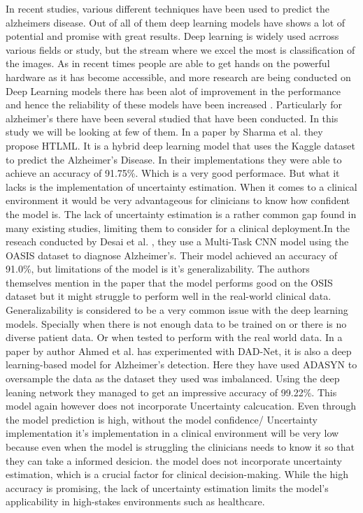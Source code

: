 \documentclass[12pt,onecolumn]{report}
\begin{document}
In recent studies, various different techniques have been used to predict the alzheimers disease. Out of all of them deep learning models have shows a lot of potential and promise with great results. Deep learning is widely used acrross various fields or study, but the stream where we excel the most is classification of the images. As in recent times people are able to get hands on the powerful hardware as it has become accessible, and more research are being conducted on Deep Learning models there has been alot of improvement in the performance and hence the reliability of these models have been increased \cite{Yu2023}.
Particularly for alzheimer's there have been several studied that have been conducted. In this study we will be looking at few of them. In a paper by Sharma et al. \cite{2022Sarang} they propose HTLML. It is a hybrid deep learning model that uses the Kaggle dataset to predict the Alzheimer’s Disease. In their implementations they were able to achieve an accuracy of 91.75\%. Which is a very good performace. But what it lacks is the implementation of uncertainty estimation. When it comes to a clinical environment it would be very advantageous for clinicians to know how confident the model is. The lack of uncertainty estimation is a rather common gap found in many existing studies, limiting them to consider for a clinical deployment.In the reseach conducted by Desai et al. \cite{2024Desai}, they use a Multi-Task CNN model using the OASIS dataset to diagnose Alzheimer’s. Their model achieved an accuracy of 91.0\%, but limitations of the model is it's generalizability. The authors themselves mention in the paper that the model performs good on the OSIS dataset but it might struggle to perform well in the real-world clinical data. Generalizability is considered to be a very common issue with the deep learning models. Specially when there is not enough data to be trained on or there is no diverse patient data. Or when tested to perform with the real world data. In a paper by author Ahmed et al. \cite{2022Ahmed} has experimented with DAD-Net, it is also a deep learning-based model for Alzheimer’s detection. Here they have used ADASYN to oversample the data as the dataset they used was imbalanced. Using the deep leaning network they managed to get an impressive accuracy of 99.22\%. This model again however does not incorporate Uncertainty calcucation. Even through the model prediction is high, without the model confidence/ Uncertainty implementation it's implementation in a clinical environment will be very low because even when the model is struggling the clinicians needs to know it so that they can take a informed desicion. the model does not incorporate uncertainty estimation, which is a crucial factor for clinical decision-making. While the high accuracy is promising, the lack of uncertainty estimation limits the model's applicability in high-stakes environments such as healthcare.
\end{document}
